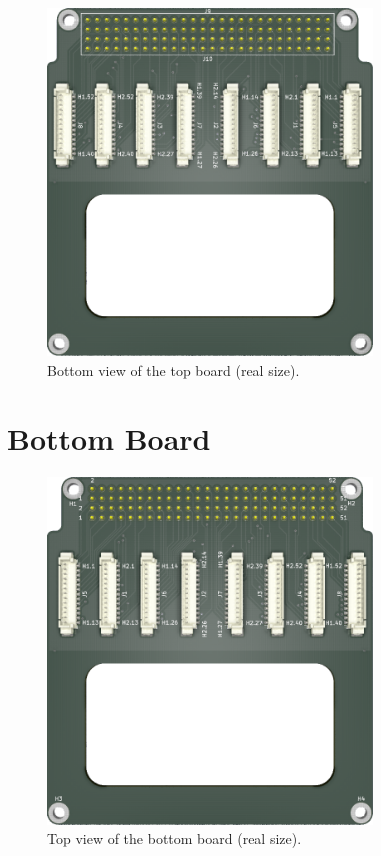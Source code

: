 \begin{figure}[!htb]
    \begin{center}
        \includegraphics[width=8.636cm]{figures/pc104-adapter-top-bottom}
        \caption{Bottom view of the top board (real size).}
        \label{fig:top-board-bottom}
    \end{center}
\end{figure}

\section{Bottom Board}

\begin{figure}[!htb]
    \begin{center}
        \includegraphics[width=8.626cm]{figures/pc104-adapter-bottom-top}
        \caption{Top view of the bottom board (real size).}
        \label{fig:bottom-board-top}
    \end{center}
\end{figure}

